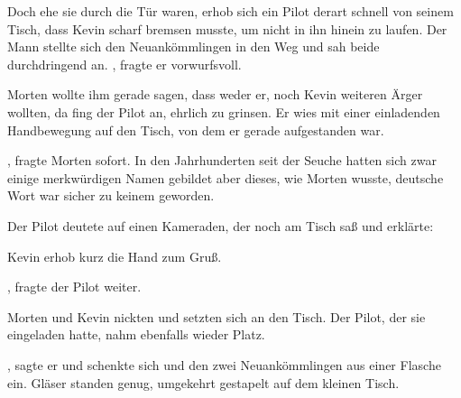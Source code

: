 \par

Doch ehe sie durch die Tür waren, erhob sich ein Pilot derart schnell von seinem Tisch, dass Kevin scharf bremsen musste, um nicht in ihn hinein zu laufen. Der Mann stellte sich den  Neuankömmlingen in den Weg und sah beide durchdringend an. , fragte er vorwurfsvoll.

\par

Morten wollte ihm gerade sagen, dass weder er, noch Kevin weiteren Ärger wollten, da fing der Pilot an, ehrlich zu grinsen. Er wies mit einer einladenden Handbewegung auf den Tisch, von dem er gerade aufgestanden war. 

\par

, fragte Morten sofort. In den Jahrhunderten seit der Seuche hatten sich zwar einige merkwürdigen Namen gebildet aber dieses, wie Morten wusste, deutsche Wort war sicher zu keinem geworden.

\par

Der Pilot deutete auf einen Kameraden, der noch am Tisch saß und erklärte: 

\par

Kevin erhob kurz die Hand zum Gruß.

\par

, fragte der Pilot weiter.

\par

Morten und Kevin nickten und setzten sich an den Tisch. Der Pilot, der sie eingeladen hatte, nahm ebenfalls wieder Platz.

\par

, sagte er und schenkte sich und den zwei Neuankömmlingen aus einer Flasche ein. Gläser standen genug, umgekehrt gestapelt auf dem kleinen Tisch. 

\par

